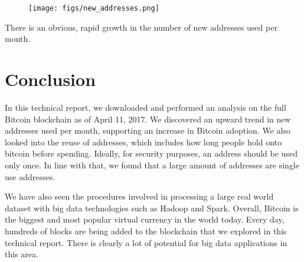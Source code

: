 \documentclass[9pt,twocolumn,twoside]{idsi}
\begin{document}
\begin{figure}[!ht]
\texttt{[image: figs/new\_addresses.png]}
\end{figure}

There is an obvious, rapid growth in the number of new addresses used per month.

\section{Conclusion}
In this technical report, we downloaded and performed an analysis on the full Bitcoin blockchain as of April 11, 2017. We discovered an upward trend in new addresses used per month, supporting an increase in Bitcoin adoption. We also looked into the reuse of addresses, which includes how long people hold onto bitcoin before spending. Ideally, for security purposes, an address should be used only once. In line with that, we found that a large amount of addresses are single use addresses.

We have also seen the procedures involved in processing a large real world dataset with big data technologies such as Hadoop and Spark. Overall, Bitcoin is the biggest and most popular virtual currency in the world today. Every day, hundreds of blocks are being added to the blockchain that we explored in this technical report. There is clearly a lot of potential for big data applications in this area.
\end{document}
